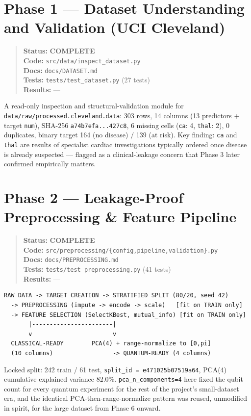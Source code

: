 \documentclass[11pt,a4paper]{article}
\newcommand{\code}[1]{\texttt{\small #1}}
\newcommand{\done}{\textcolor{donecolor}{\textbf{COMPLETE}}}
\newcommand{\phasestatus}[5]{%
\begin{quote}\small\raggedright
\textbf{Status:} #1 \\
\textbf{Code:} #2 \\
\textbf{Docs:} #3 \\
\textbf{Tests:} #4 \\
\textbf{Results:} #5
\end{quote}}
\begin{document}
\section{Phase 1 --- Dataset Understanding and Validation (UCI Cleveland)}
\label{sec:phase1}

\phasestatus{\done}{\code{src/data/inspect\_dataset.py}}{\code{docs/DATASET.md}}{\code{tests/test\_dataset.py} (27 tests)}{---}

A read-only inspection and structural-validation module for \code{data/raw/processed.cleveland.data}: 303 rows, 14 columns (13 predictors + target \code{num}), SHA-256 \code{a74b7efa...427c8}, 6 missing cells (\code{ca}: 4, \code{thal}: 2), 0 duplicates, binary target 164 (no disease) / 139 (at risk). Key finding: \code{ca} and \code{thal} are results of specialist cardiac investigations typically ordered once disease is already suspected --- flagged as a clinical-leakage concern that Phase 3 later confirmed empirically matters.

\section{Phase 2 --- Leakage-Proof Preprocessing \& Feature Pipeline}
\label{sec:phase2}

\phasestatus{\done}{\code{src/preprocessing/\{config,pipeline,validation\}.py}}{\code{docs/PREPROCESSING.md}}{\code{tests/test\_preprocessing.py} (41 tests)}{---}

\begin{center}
\begin{lstlisting}
RAW DATA -> TARGET CREATION -> STRATIFIED SPLIT (80/20, seed 42)
  -> PREPROCESSING (impute -> encode -> scale)   [fit on TRAIN only]
  -> FEATURE SELECTION (SelectKBest, mutual_info) [fit on TRAIN only]
       |-----------------------|
       v                       v
  CLASSICAL-READY        PCA(4) + range-normalize to [0,pi]
  (10 columns)                 -> QUANTUM-READY (4 columns)
\end{lstlisting}
\end{center}

Locked split: 242 train / 61 test, \code{split\_id = e471025b07519a64}, PCA(4) cumulative explained variance 82.0\%. \code{pca\_n\_components=4} here fixed the qubit count for every quantum experiment for the rest of the project's small-dataset era, and the identical PCA-then-range-normalize pattern was reused, unmodified in spirit, for the large dataset from Phase 6 onward.
\end{document}
